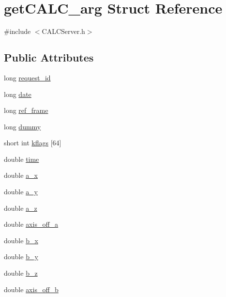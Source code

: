 \hypertarget{structget_c_a_l_c__arg}{}\section{get\+C\+A\+L\+C\+\_\+arg Struct Reference}
\label{structget_c_a_l_c__arg}


{\ttfamily \#include $<$C\+A\+L\+C\+Server.\+h$>$}

\subsection*{Public Attributes}
\begin{DoxyCompactItemize}
\item 
long \hyperlink{structget_c_a_l_c__arg_a23eb9d0da489d4f8c9a10ae72d34bd7b}{request\+\_\+id}
\item 
long \hyperlink{structget_c_a_l_c__arg_a5ead419c2f01ac11a298b43c02db162c}{date}
\item 
long \hyperlink{structget_c_a_l_c__arg_a14bd27e5cca9ca1ffd48f05648feb624}{ref\+\_\+frame}
\item 
long \hyperlink{structget_c_a_l_c__arg_ab19e601597ca490661b92ea63a4d0d97}{dummy}
\item 
short int \hyperlink{structget_c_a_l_c__arg_a54770228fc8dc428ea5ae2e5b6cefcf4}{kflags} \mbox{[}64\mbox{]}
\item 
double \hyperlink{structget_c_a_l_c__arg_a6fadabd73a2bc43fed35806cc6aa9045}{time}
\item 
double \hyperlink{structget_c_a_l_c__arg_a9a53c477664df2652be5b177a24653e9}{a\+\_\+x}
\item 
double \hyperlink{structget_c_a_l_c__arg_a15a1e316c1b2535d6867a74fee50a505}{a\+\_\+y}
\item 
double \hyperlink{structget_c_a_l_c__arg_a29cb8c4ed111c1dad4f3c2a51e5bec36}{a\+\_\+z}
\item 
double \hyperlink{structget_c_a_l_c__arg_aa400a83f5e63b44d71aaa0b4d084d8fe}{axis\+\_\+off\+\_\+a}
\item 
double \hyperlink{structget_c_a_l_c__arg_a5aec6dba5b0904ec0f6c1a6e827d53e3}{b\+\_\+x}
\item 
double \hyperlink{structget_c_a_l_c__arg_aa7804ceb9212f589d01e62f8e35b6583}{b\+\_\+y}
\item 
double \hyperlink{structget_c_a_l_c__arg_a3e774dcde57d3242b8f5dac34aa22f44}{b\+\_\+z}
\item 
double \hyperlink{structget_c_a_l_c__arg_a87c945708ea4205ddde105f649804b45}{axis\+\_\+off\+\_\+b}

\end{DoxyCompactItemize}
